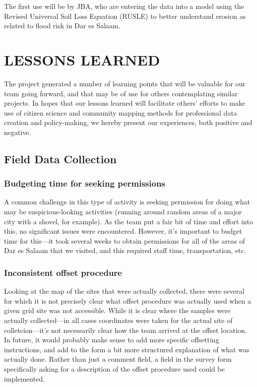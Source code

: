 \documentclass[a4paper,12pt,twoside]{article}
\begin{document}
The first use will be by JBA, who are entering the data into a model using the Revised Universal Soil Loss Equation (RUSLE) to better understand erosion as related to flood risk in Dar es Salaam.

\color{RHblue}
\hypertarget{lessonslearned}{}
\section{LESSONS LEARNED}
\label{lessonslearned}
\color{RHgrey}
The project generated a number of learning points that will be valuable for our team going forward, and that may be of use for others contemplating similar projects. In hopes that our lessons learned will facilitate others' efforts to make use of citizen science and community mapping methods for professional data creation and policy-making, we hereby present our experiences, both positive and negative.

\color{RHblue}
\subsection{Field Data Collection}
\label{fielddatacollection}

\subsubsection{Budgeting time for seeking permissions}

\color{RHgrey}
A common challenge in this type of activity is seeking permission for doing what may be suspicious-looking activities (running around random areas of a major city with a shovel, for example). As the team put a fair bit of time and effort into this, no significant issues were encountered. However, it's important to budget time for this---it took several weeks to obtain permissions for all of the areas of Dar es Salaam that we visited, and this required staff time, transportation, etc.

\color{RHblue}
\subsubsection{Inconsistent offset procedure}
\color{RHgrey}
Looking at the map of the sites that were actually collected, there were several for which it is not precisely clear what offset procedure was actually used when a given grid site was not accessible. While it is clear where the samples were actually collected---in all cases coordinates were taken for the actual site of colletcion---it's not necessarily clear how the team arrived at the offset location. In future, it would probably make sense to add more specific offsetting instructions, and add to the form a bit more structured explanation of what was actually done. Rather than just a comment field, a field in the survey form specifically asking for a description of the offset procedure used could be implemented.
\end{document}
